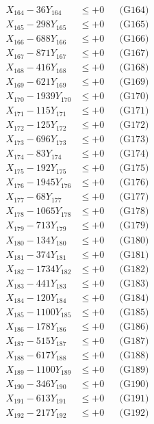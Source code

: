 \documentclass[a4paper,10pt]{article}
\begin{document}
{\begin{align}
X_{164} - 36Y_{164} &\leq +0 && \text{(G164)} \\
X_{165} - 298Y_{165} &\leq +0 && \text{(G165)} \\
X_{166} - 688Y_{166} &\leq +0 && \text{(G166)} \\
X_{167} - 871Y_{167} &\leq +0 && \text{(G167)} \\
X_{168} - 416Y_{168} &\leq +0 && \text{(G168)} \\
X_{169} - 621Y_{169} &\leq +0 && \text{(G169)} \\
X_{170} - 1939Y_{170} &\leq +0 && \text{(G170)} \\
\allowbreak
X_{171} - 115Y_{171} &\leq +0 && \text{(G171)} \\
X_{172} - 125Y_{172} &\leq +0 && \text{(G172)} \\
X_{173} - 696Y_{173} &\leq +0 && \text{(G173)} \\
X_{174} - 83Y_{174} &\leq +0 && \text{(G174)} \\
X_{175} - 192Y_{175} &\leq +0 && \text{(G175)} \\
X_{176} - 1945Y_{176} &\leq +0 && \text{(G176)} \\
X_{177} - 68Y_{177} &\leq +0 && \text{(G177)} \\
X_{178} - 1065Y_{178} &\leq +0 && \text{(G178)} \\
X_{179} - 713Y_{179} &\leq +0 && \text{(G179)} \\
X_{180} - 134Y_{180} &\leq +0 && \text{(G180)} \\
\allowbreak
X_{181} - 374Y_{181} &\leq +0 && \text{(G181)} \\
X_{182} - 1734Y_{182} &\leq +0 && \text{(G182)} \\
X_{183} - 441Y_{183} &\leq +0 && \text{(G183)} \\
X_{184} - 120Y_{184} &\leq +0 && \text{(G184)} \\
X_{185} - 1100Y_{185} &\leq +0 && \text{(G185)} \\
X_{186} - 178Y_{186} &\leq +0 && \text{(G186)} \\
X_{187} - 515Y_{187} &\leq +0 && \text{(G187)} \\
X_{188} - 617Y_{188} &\leq +0 && \text{(G188)} \\
X_{189} - 1100Y_{189} &\leq +0 && \text{(G189)} \\
X_{190} - 346Y_{190} &\leq +0 && \text{(G190)} \\
\allowbreak
X_{191} - 613Y_{191} &\leq +0 && \text{(G191)} \\
X_{192} - 217Y_{192} &\leq +0 && \text{(G192)} \\

\end{align}}
\end{document}
